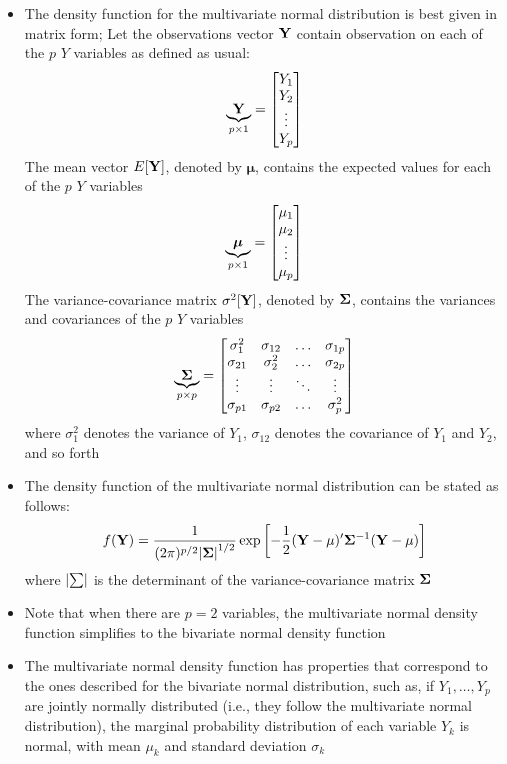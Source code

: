 \begin{itemize}
\item The density function for the multivariate normal distribution is best given in matrix form; Let the observations vector $\mathbf{Y}$ contain observation on each of the $p$ $Y$ variables as defined as usual: $$ \underbrace{\mathbf{Y}}_{p \times 1} = \begin{bmatrix} Y_1 \\ Y_2 \\ \vdots \\ Y_p \end{bmatrix} $$ The mean vector $E[\mathbf{Y}]$, denoted by $\bm{\mu}$, contains the expected values for each of the $p$ $Y$ variables $$ \underbrace{\bm{\mu}}_{p \times 1} = \begin{bmatrix}  \mu_1 \\ \mu_2 \\ \vdots \\ \mu_p \end{bmatrix} $$ The variance-covariance matrix $\sigma^2[\mathbf{Y}]$, denoted by $\mathbf{\Sigma}$, contains the variances and covariances of the $p$ $Y$ variables $$ \underbrace{\mathbf{\Sigma}}_{p \times p} = \begin{bmatrix}  \sigma^2_1 & \sigma_{12} & \hdots & \sigma_{1p} \\ \sigma_{21} & \sigma_2^2 & \hdots & \sigma_{2p} \\ \vdots & \vdots & \ddots & \vdots \\ \sigma_{p1} & \sigma_{p2} & \hdots & \sigma^2_p \end{bmatrix} $$ where $\sigma_1^2$ denotes the variance of $Y_1$, $\sigma_{12}$ denotes the covariance of $Y_1$ and $Y_2$, and so forth
\item The density function of the multivariate normal distribution can be stated as follows: $$ f(\mathbf{Y}) = \frac{1}{(2\pi)^{p/2} \abs{\mathbf{\Sigma}}^{1/2}}\exp\left[-\frac{1}{2} (\mathbf{Y} - \mathbf{\mu})'\mathbf{\Sigma}^{-1}(\mathbf{Y} - \mathbf{\mu})\right] $$ where $\abs{\mathbf{\sum}}$ is the determinant of the variance-covariance matrix $\mathbf{\Sigma}$
\item Note that when there are $p=2$ variables, the multivariate normal density function simplifies to the bivariate normal density function 
\item The multivariate normal density function has properties that correspond to the ones described for the bivariate normal distribution, such as, if $Y_1,\dots, Y_p$ are jointly normally distributed (i.e., they follow the multivariate normal distribution), the marginal probability distribution of each variable $Y_k$ is normal, with mean $\mu_k$ and standard deviation $\sigma_k$
\end{itemize}  

